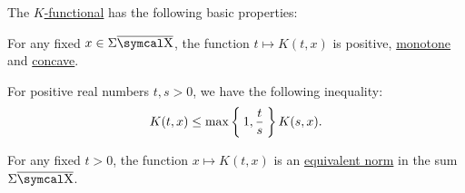 \begin{proposition}\label{def:k_functional_properties}
  The \hyperref[def:k_functional]{\( K \)-functional} has the following basic properties:

  \begin{PropEnum}
     For any fixed \( x \in \Sigma \Ol{\CX} \), the function \( t \mapsto K(t, x) \) is positive, \hyperref[def:monotone_map]{monotone} and \hyperref[def:convex_functions]{concave}.

     For positive real numbers \( t, s > 0 \), we have the following inequality:
    \begin{equation}\label{eq:def:k_functional_properties/inequality}
      K(t, x) \leq \max\Set{1, \frac t s} K(s, x).
    \end{equation}

     For any fixed \( t > 0 \), the function \( x \mapsto K(t, x) \) is an \hyperref[def:equivalent_metrics]{equivalent norm} in the sum \( \Sigma \Ol{\CX} \).
  \end{PropEnum}
\end{proposition}
